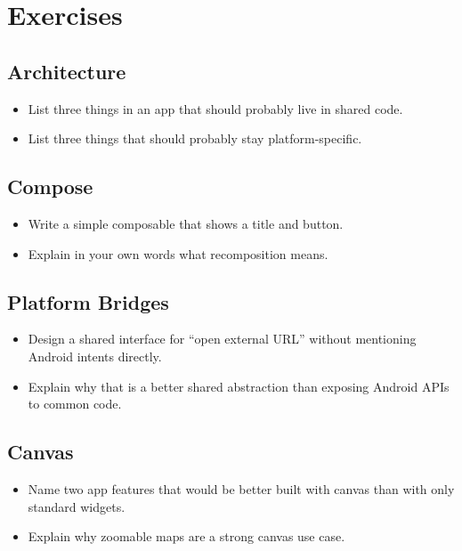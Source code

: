\documentclass[11pt,a4paper]{article}
\begin{document}
\section{Exercises}

\subsection{Architecture}

\begin{itemize}
    \item List three things in an app that should probably live in shared code.
    \item List three things that should probably stay platform-specific.
\end{itemize}

\subsection{Compose}

\begin{itemize}
    \item Write a simple composable that shows a title and button.
    \item Explain in your own words what recomposition means.
\end{itemize}

\subsection{Platform Bridges}

\begin{itemize}
    \item Design a shared interface for ``open external URL'' without mentioning Android intents directly.
    \item Explain why that is a better shared abstraction than exposing Android APIs to common code.
\end{itemize}

\subsection{Canvas}

\begin{itemize}
    \item Name two app features that would be better built with canvas than with only standard widgets.
    \item Explain why zoomable maps are a strong canvas use case.
\end{itemize}
\end{document}
